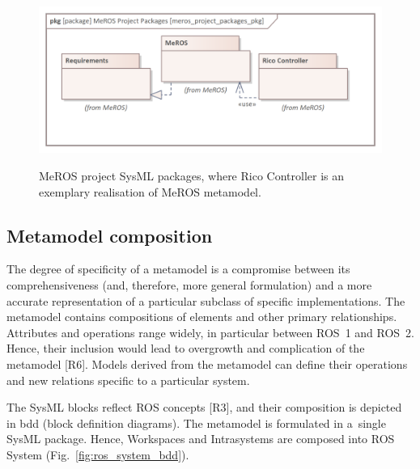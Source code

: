 \documentclass{ieeeaccess}
\begin{document}
	\begin{figure}[H]
		\centering
		\begin{center}
			{\includegraphics[scale=0.7]{img/meros_project_packages_pkg.png}}
		\end{center}
		\caption{MeROS project SysML packages, where Rico Controller is an exemplary realisation of MeROS metamodel.} 
		\label{fig:meros_project_packages_pkg}
	\end{figure}
	
\subsection{Metamodel composition}
\label{sec:metamodel-composition}

	The degree of specificity of a metamodel is a compromise between its comprehensiveness (and, therefore, more general formulation) and a more accurate representation of a particular subclass of specific implementations. The metamodel contains compositions of elements and other primary relationships. Attributes and operations range widely, in particular between ROS~1 and ROS~2. Hence, their inclusion would lead to overgrowth and complication of the metamodel [R6]. Models derived from the metamodel can define their operations and new relations specific to a particular system. 
	
	The SysML blocks reflect ROS concepts [R3], and their composition is depicted in bdd (block definition diagrams). The metamodel is formulated in a~single SysML package. Hence, Workspaces and Intrasystems are composed into ROS System (Fig.~\ref{fig:ros_system_bdd}). 
	
\end{document}
